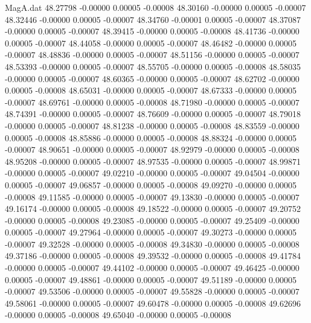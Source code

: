 \begin{filecontents}{MagA.dat}
  48.27798   -0.00000    0.00005   -0.00008
  48.30160   -0.00000    0.00005   -0.00007
  48.32446   -0.00000    0.00005   -0.00007
  48.34760   -0.00001    0.00005   -0.00007
  48.37087   -0.00000    0.00005   -0.00007
  48.39415   -0.00000    0.00005   -0.00008
  48.41736   -0.00000    0.00005   -0.00007
  48.44058   -0.00000    0.00005   -0.00007
  48.46482   -0.00000    0.00005   -0.00007
  48.48836   -0.00000    0.00005   -0.00007
  48.51156   -0.00000    0.00005   -0.00007
  48.53393   -0.00000    0.00005   -0.00007
  48.55705   -0.00000    0.00005   -0.00008
  48.58035   -0.00000    0.00005   -0.00007
  48.60365   -0.00000    0.00005   -0.00007
  48.62702   -0.00000    0.00005   -0.00008
  48.65031   -0.00000    0.00005   -0.00007
  48.67333   -0.00000    0.00005   -0.00007
  48.69761   -0.00000    0.00005   -0.00008
  48.71980   -0.00000    0.00005   -0.00007
  48.74391   -0.00000    0.00005   -0.00007
  48.76609   -0.00000    0.00005   -0.00007
  48.79018   -0.00000    0.00005   -0.00007
  48.81238   -0.00000    0.00005   -0.00008
  48.83559   -0.00000    0.00005   -0.00008
  48.85886   -0.00000    0.00005   -0.00008
  48.88324   -0.00000    0.00005   -0.00007
  48.90651   -0.00000    0.00005   -0.00007
  48.92979   -0.00000    0.00005   -0.00008
  48.95208   -0.00000    0.00005   -0.00007
  48.97535   -0.00000    0.00005   -0.00007
  48.99871   -0.00000    0.00005   -0.00007
  49.02210   -0.00000    0.00005   -0.00007
  49.04504   -0.00000    0.00005   -0.00007
  49.06857   -0.00000    0.00005   -0.00008
  49.09270   -0.00000    0.00005   -0.00008
  49.11585   -0.00000    0.00005   -0.00007
  49.13830   -0.00000    0.00005   -0.00007
  49.16174   -0.00000    0.00005   -0.00008
  49.18522   -0.00000    0.00005   -0.00007
  49.20752   -0.00000    0.00005   -0.00008
  49.23085   -0.00000    0.00005   -0.00007
  49.25409   -0.00000    0.00005   -0.00007
  49.27964   -0.00000    0.00005   -0.00007
  49.30273   -0.00000    0.00005   -0.00007
  49.32528   -0.00000    0.00005   -0.00008
  49.34830   -0.00000    0.00005   -0.00008
  49.37186   -0.00000    0.00005   -0.00008
  49.39532   -0.00000    0.00005   -0.00008
  49.41784   -0.00000    0.00005   -0.00007
  49.44102   -0.00000    0.00005   -0.00007
  49.46425   -0.00000    0.00005   -0.00007
  49.48861   -0.00000    0.00005   -0.00007
  49.51189   -0.00000    0.00005   -0.00007
  49.53506   -0.00000    0.00005   -0.00007
  49.55828   -0.00000    0.00005   -0.00007
  49.58061   -0.00000    0.00005   -0.00007
  49.60478   -0.00000    0.00005   -0.00008
  49.62696   -0.00000    0.00005   -0.00008
  49.65040   -0.00000    0.00005   -0.00008

\end{filecontents}
